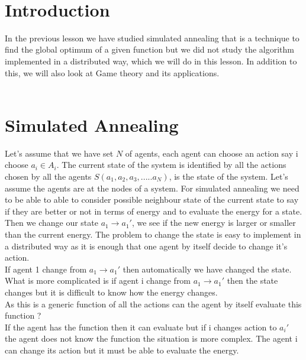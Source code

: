  \\
\section{Introduction}
In the previous lesson we have studied simulated annealing that is a technique to find the global optimum of a given function but we did not study the algorithm implemented in a distributed way, which we will do in this lesson. In addition to this, we will also look at Game theory and its applications.
\\ \\
\section{Simulated Annealing}
Let's assume that we have set $N $ of agents, each agent can choose an action say i choose $a_i \in A_i $. The current state of the system is identified by all the actions chosen by all the agents $S(a_1,a_2,a_3,.....a_N)$, is the state of the system. Let's assume the agents are at the nodes of a system. For simulated annealing  we need to be able to able to consider possible neighbour state of the current state to say if they are better or not in terms of energy and to evaluate the energy for a state. \\ \hfill \break
  Then we change our state $a_1 \longrightarrow a_1'$, we see if the new energy is larger or smaller than the current energy.
  The problem to change the state is easy  to implement in a distributed way as it is enough that one agent by itself decide to change it's action.\\
  If agent 1 change from $a_1 \longrightarrow a_1'$
then automatically we have changed the state. What is more complicated is if agent i change from $a_1 \longrightarrow a_1'$ then the state changes but it is difficult to know how the energy changes.\\ \hfill \break 
As this is a generic function of all the actions can the agent by itself evaluate this function ? \\
If the agent has the function then it can evaluate but if i changes action to $a_i'$     the agent does not know the function the situation is more complex. 
The agent i can change its action but it must be able to evaluate the energy.\\

